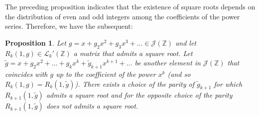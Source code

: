 \documentclass[preprint,12pt]{elsarticle}
\newtheorem{prop}[thm]{Proposition}
\begin{document}















The preceding proposition indicates that the existence of square roots depends on the distribution of even and odd integers among the coefficients of the power series. Therefore, we have the subsequent:

\begin{prop} Let $g=x+g_2x^2+g_3x^3+\ldots\in\mathcal J(\mathbb Z)$ and let $R_k(1,g)\in\mathcal L_k'(\mathbb Z)$ a matrix that admits a square root. 
Let $\widetilde g=x+g_2x^2+\ldots+g_kx^k+\widetilde g_{k+1}x^{k+1}+\ldots$ be another element in $\mathcal J(\mathbb Z)$ that coincides with $g$ up to the coefficient of the power $x^k$ (and so $R_k(1,g)=R_k(1,\widetilde g)$). There exists a choice of the parity of $\widetilde g_{k+1}$ for which $R_{k+1}(1,\widetilde g)$ admits a square root and for the opposite choice of the parity $R_{k+1}(1,\widetilde g)$ does not admits a square root.
\end{prop}
\end{document}

